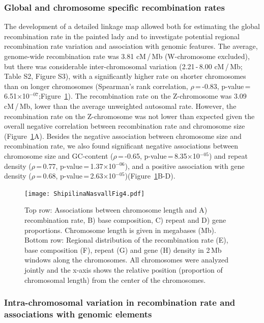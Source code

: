\documentclass[twocolumn]{bmcart}%
\begin{document}
\subsubsection*{Global and chromosome specific recombination rates}
The development of a detailed linkage map allowed both for estimating the global recombination rate in the painted lady and to investigate potential regional recombination rate variation and association with genomic features. The average, genome-wide recombination rate was 3.81 cM\,/\,Mb (W-chromosome excluded), but there was considerable inter-chromosomal variation (2.21\,-\,8.00 cM\,/\,Mb; Table S2, Figure S3), with a significantly higher rate on shorter chromosomes than on longer chromosomes (Spearman’s rank correlation, $\rho$\,=\,-0.83, p-value\,=\,6.51$\times$10$^{-07}$;Figure~\ref{fig:4}). The recombination rate on the Z-chromosome was 3.09 cM\,/\,Mb, lower than the average unweighted autosomal rate. However, the recombination rate on the Z-chromosome was not lower than expected given the overall negative correlation between recombination rate and chromosome size (Figure~\ref{fig:4}A). Besides the negative association between chromosome size and  recombination rate, we also found significant negative associations between chromosome size and GC-content ($\rho$\,=\,-0.65, p-value\,=\,8.35$\times$10$^{-05}$) and repeat density ($\rho$\,=\,0.77, p-value\,=\,1.37$\times$10$^{-06}$), and a positive association with gene density ($\rho$\,=\,0.68, p-value\,=\,2.63$\times$10$^{-05}$)(Figure~\ref{fig:4}B-D). 

\begin{figure}[tb]
    \centering
\texttt{[image: ShipilinaNasvallFig4.pdf]}
    \caption{Top row: Associations between chromosome length and A) recombination rate, B) base composition, C) repeat and D) gene proportions. Chromosome length is given in megabases (Mb). Bottom row: Regional distribution of the recombination rate (E), base composition (F), repeat (G) and gene (H) density in 2\,Mb windows along the chromosomes. All chromosomes were analyzed jointly and the x-axis shows the relative position (proportion of chromosomal length) from the center of the chromosomes.}
    \label{fig:4}
\end{figure}

\subsubsection*{Intra-chromosomal variation in recombination rate and associations with genomic elements}
\end{document}
